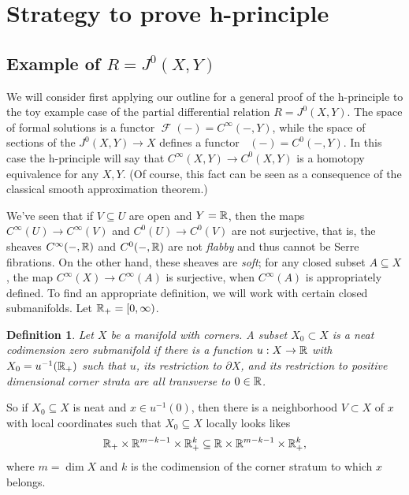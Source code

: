 \documentclass{article}
\newtheorem{definition}[theorem]{Definition}
\newtheorem{proposed work}[theorem]{Proposed Work}
\DeclareMathOperator{\CF}{\mathcal F}
\DeclareMathOperator{\CFh}{\mathcal{F}^{h}} %
\begin{document}
%
%

\section{Strategy to prove h-principle}


\subsection{Example of $R = J^0(X,Y)$}

We will consider first applying our outline for a general proof of the
h-principle to the toy example case of the partial differential
relation $R = J^0(X,Y)$. The space of formal solutions is a functor
$\CF(-) = C^\infty(- , Y)$, while the space of sections of the
$J^0(X,Y)\to X$ defines a functor $\CFh(-) = C^0(-,Y)$. In this case
the h-principle will say that $C^\infty(X,Y) \to C^0(X,Y)$ is a
homotopy equivalence for any $X,Y$. %
(Of course, this fact can be seen as a consequence of the classical smooth
approximation theorem.)

We've seen that if $V\subseteq U$ are open and $Y=\mathbb R$, then the maps
$C^\infty(U)\to C^\infty(V)$ and $C^0(U)\to C^0(V)$ are not
surjective, that is, the sheaves $C^\infty(-,\mathbb R)$ and $C^0(-, \mathbb R)$ are
not {\em flabby} and thus cannot be Serre fibrations. On the other
hand, these sheaves are {\em soft}; for any closed subset
$A\subseteq X$, the map $C^\infty(X) \to C^\infty(A)$ is surjective,
when $C^\infty(A)$ is appropriately defined. To find an appropriate
definition, we will work with certain closed submanifolds. Let $\mathbb R_+ =
[0,\infty)$. 

\begin{definition} \label{def:neat} Let $X$ be a manifold with
  corners. A subset $X_0\subset X$ is a {\em neat codimension zero
    submanifold} if there is a function $u: X\to \mathbb R$ with
  $X_0 = u^{-1}(\mathbb R_+)$ such that $u$, its restriction to $\partial X$,
  and its restriction to positive dimensional corner strata are all
  transverse to $0\in \mathbb R$.
\end{definition}

So if $X_0\subseteq X$ is neat and $x\in u^{-1}(0)$, then there is a
neighborhood $V\subset X$ of $x$ with local coordinates such that
$X_0 \subseteq X$ locally looks likes
\[\mathbb R_+ \times \mathbb R^{m-k-1}\times \mathbb R_+^k \subseteq \mathbb R\times
  \mathbb R^{m-k-1}\times \mathbb R_+^k,\] where $m = \dim X$ and $k$ is the
codimension of the corner stratum to which $x$ belongs.
\end{document}
